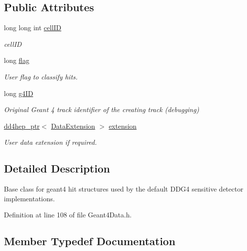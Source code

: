 \subsection*{Public Attributes}
\begin{DoxyCompactItemize}
\item 
long long int \hyperlink{class_d_d4hep_1_1_simulation_1_1_geant4_hit_data_a3ad003b720e4d7a1c6e66e0eabb58540}{cell\+ID}
\begin{DoxyCompactList}\small\item\em cell\+ID \end{DoxyCompactList}\item 
long \hyperlink{class_d_d4hep_1_1_simulation_1_1_geant4_hit_data_aee4dddb74fa4230f4a450f5eb96416af}{flag}
\begin{DoxyCompactList}\small\item\em User flag to classify hits. \end{DoxyCompactList}\item 
long \hyperlink{class_d_d4hep_1_1_simulation_1_1_geant4_hit_data_adaf354d937bc941aac70b2327aa1d1f3}{g4\+ID}
\begin{DoxyCompactList}\small\item\em Original Geant 4 track identifier of the creating track (debugging) \end{DoxyCompactList}\item 
\hyperlink{class_d_d4hep_1_1dd4hep__ptr}{dd4hep\+\_\+ptr}$<$ \hyperlink{class_d_d4hep_1_1_simulation_1_1_data_extension}{Data\+Extension} $>$ \hyperlink{class_d_d4hep_1_1_simulation_1_1_geant4_hit_data_a56ce0428b9799cf18cab288a77c6e3c5}{extension}
\begin{DoxyCompactList}\small\item\em User data extension if required. \end{DoxyCompactList}\end{DoxyCompactItemize}


\subsection{Detailed Description}
Base class for geant4 hit structures used by the default D\+D\+G4 sensitive detector implementations. 

Definition at line 108 of file Geant4\+Data.\+h.



\subsection{Member Typedef Documentation}
\hypertarget{class_d_d4hep_1_1_simulation_1_1_geant4_hit_data_aec2f53237eac2db7d83dd03bca8719c5}{}\label{class_d_d4hep_1_1_simulation_1_1_geant4_hit_data_aec2f53237eac2db7d83dd03bca8719c5} 
